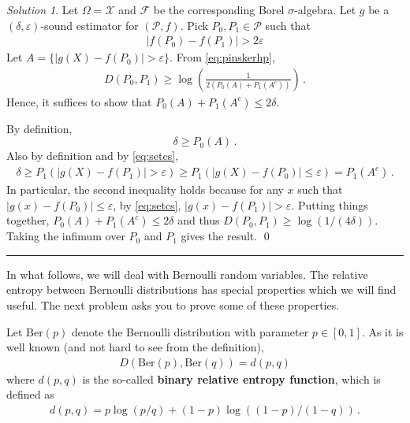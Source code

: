 \documentclass{article}
\newcommand{\cP}{\mathcal{P}}
\newcommand{\cX}{\mathcal{X}}
\DeclareMathOperator*{\1}{\mathbbm{1}}
\newcommand{\cF}{\mathcal{F}}
\newcommand{\0}{\mathbf{0}}
\theoremstyle{definition}
\theoremstyle{remark}
\newtheorem*{solution*}{Solution}
\theoremstyle{theorem}
\begin{document}
\begin{solution*}
Let $\Omega = \cX$ and $\cF$ be the corresponding Borel $\sigma$-algebra.
Let $g$ be a $(\delta,\varepsilon)$-sound estimator for $(\cP,f)$.
Pick $P_0,P_1\in \cP$ such that 
\begin{align}
|f(P_0)-f(P_1)|>2\varepsilon 
\label{eq:setcs}
\end{align}
Let $A = \{ |g(X)-f(P_0)|>\varepsilon \}$. 
From \cref{eq:pinskerhp},
\begin{align*}
D(P_0,P_1)\ge \log\left( \frac{1}{2( P_0(A)+P_1(A^c) )} \right)\,.
\end{align*}
Hence, it suffices to show that $ P_0(A)+P_1(A^c)\le 2\delta$.

By definition,
\[
\delta \ge P_0(A)\,.
\]
Also by definition and by \cref{eq:setcs}, 
\begin{align*}
\delta \ge P_1( |g(X)-f(P_1)|>\varepsilon ) \ge P_1( |g(X)-f(P_0)|\le \varepsilon) = P_1(A^c)\,.
\end{align*}
In particular, the second inequality holds because for any $x$ such that $|g(x)-f(P_0)|\le \varepsilon$, 
by \cref{eq:setcs}, $|g(x)-f(P_1)|>\varepsilon$.
Putting things together, $P_0(A)+P_1(A^c)\le 2\delta$ and thus $D(P_0,P_1) \ge \log(1/(4\delta))$.
Taking the infimum over $P_0$ and $P_1$ gives the result.
\qed\par\smallskip\hrule
\end{solution*}

In what follows, we will deal with Bernoulli random variables. The relative entropy between Bernoulli distributions has special properties which we will find useful. The next problem asks you to prove some of these properties.

\newcommand{\Ber}{\text{Ber}}
Let $\Ber(p)$ denote the Bernoulli distribution with parameter $p\in [0,1]$. 
As it is well known (and not hard to see from the definition),
\begin{align*}
D(\Ber(p),\Ber(q)) = d(p,q)
\end{align*}
where $d(p,q)$ is the so-called \textbf{binary relative entropy function}, which is defined as
\begin{align*}
d(p,q) = p\log(p/q) + (1-p) \log( (1-p)/(1-q))\,.
\end{align*}
\end{document}
